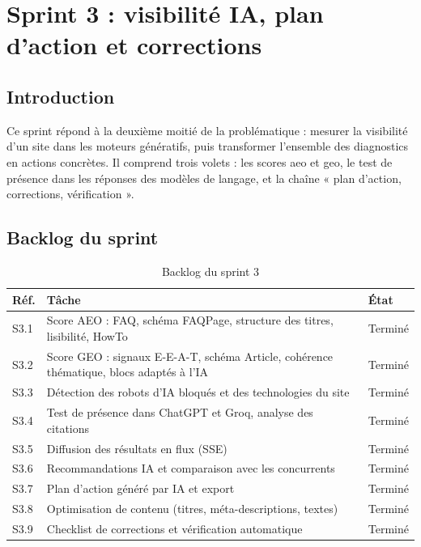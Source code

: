 \chapter{Sprint 3 : visibilité IA, plan d'action et corrections}\label{chap-visibilite}

\section{Introduction}
Ce sprint répond à la deuxième moitié de la problématique : mesurer la visibilité d'un site dans les moteurs génératifs, puis transformer l'ensemble des diagnostics en actions concrètes. Il comprend trois volets : les scores \gls{aeo} et \gls{geo}, le test de présence dans les réponses des modèles de langage, et la chaîne « plan d'action, corrections, vérification ».

\section{Backlog du sprint}
\begin{table}[htbp]
\centering
\small
\caption{Backlog du sprint 3}\label{tab-backlog-s3}
\begin{tabularx}{\textwidth}{@{}lXl@{}}
\toprule
\textbf{Réf.} & \textbf{Tâche} & \textbf{État}\\
\midrule
S3.1 & Score AEO : FAQ, schéma FAQPage, structure des titres, lisibilité, HowTo & Terminé\\
S3.2 & Score GEO : signaux E-E-A-T, schéma Article, cohérence thématique, blocs adaptés à l'IA & Terminé\\
S3.3 & Détection des robots d'IA bloqués et des technologies du site & Terminé\\
S3.4 & Test de présence dans ChatGPT et Groq, analyse des citations & Terminé\\
S3.5 & Diffusion des résultats en flux (SSE) & Terminé\\
S3.6 & Recommandations IA et comparaison avec les concurrents & Terminé\\
S3.7 & Plan d'action généré par IA et export & Terminé\\
S3.8 & Optimisation de contenu (titres, méta-descriptions, textes) & Terminé\\
S3.9 & Checklist de corrections et vérification automatique & Terminé\\
\bottomrule
\end{tabularx}
\end{table}

